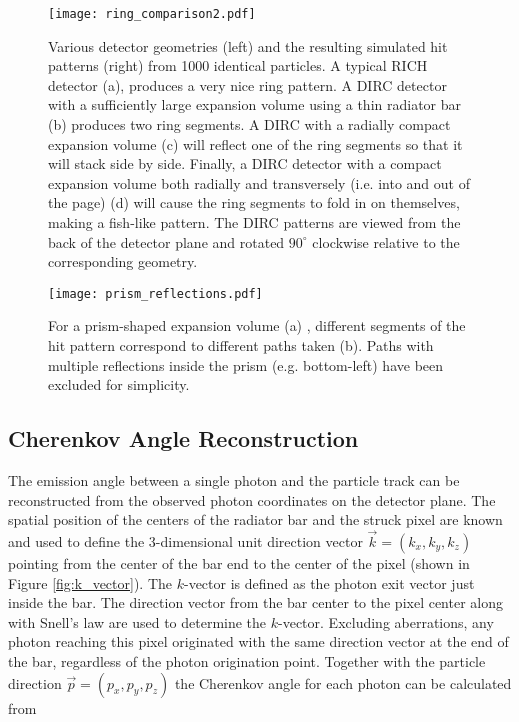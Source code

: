 \begin{figure}[H]
	\centering
	\texttt{[image: ring\_comparison2.pdf]}
	\caption[Various detector geometries (left) and the resulting simulated hit patterns (right) from 1000 identical particles.]{Various detector geometries (left) and the resulting simulated hit patterns (right) from 1000 identical particles. A typical RICH detector (a), produces a very nice ring pattern. A DIRC detector with a sufficiently large expansion volume using a thin radiator bar (b) produces two ring segments. A DIRC with a radially compact expansion volume (c) will reflect one of the ring segments so that it will stack side by side. Finally, a DIRC detector with a compact expansion volume both radially and transversely (i.e. into and out of the page) (d) will cause the ring segments to fold in on themselves, making a fish-like pattern. The DIRC patterns are viewed from the back of the detector plane and rotated $90^{\circ}$ clockwise relative to the corresponding geometry.}
	\label{fig:ring_comparison2}
\end{figure}


\begin{figure}[H]
	\centering
	\texttt{[image: prism\_reflections.pdf]}
	\caption[For a prism-shaped expansion volume (a), different segments of the hit pattern correspond to different paths taken (b).]{For a prism-shaped expansion volume (a) \cite{GregThesis}, different segments of the hit pattern correspond to different paths taken (b). Paths with multiple reflections inside the prism (e.g. bottom-left) have been excluded for simplicity.}
	\label{fig:prism_reflections}
\end{figure}

\subsection{Cherenkov Angle Reconstruction}
The emission angle between a single photon and the particle track can be reconstructed from the observed photon coordinates on the detector plane. The spatial position of the centers of the radiator bar and the struck pixel are known and used to define the 3-dimensional unit direction vector $\vec{k} = (k_x, k_y, k_z)$ pointing from the center of the bar end to the center of the pixel (shown in Figure \ref{fig:k_vector}). The $k$-vector is defined as the photon exit vector just inside the bar. The direction vector from the bar center to the pixel center along with Snell's law are used to determine the $k$-vector. Excluding aberrations, any photon reaching this pixel originated with the same direction vector at the end of the bar, regardless of the photon origination point. Together with the particle direction $\vec{p} = (p_x, p_y, p_z)$ the Cherenkov angle for each photon can be calculated from

